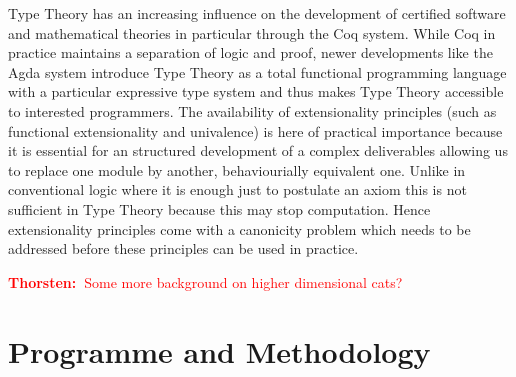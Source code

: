 \documentclass[twocolumn,a4paper]{article}
\newcommand{\txa}[1]{\textcolor{red}{\textbf{Thorsten:~}#1}}
\begin{document}
Type Theory has an increasing influence on the development of
certified software and mathematical theories in particular through the
Coq system. While Coq in practice maintains a separation of logic and
proof, newer developments like the Agda system introduce Type Theory
as a total functional programming language with a particular
expressive type system and thus makes Type Theory accessible to
interested programmers. The availability of extensionality principles
(such as functional extensionality and univalence)
is here of practical importance because it is essential for an
structured development of a complex deliverables allowing us to 
replace one module by another, behaviourially equivalent one.
Unlike in conventional logic where it is enough just to postulate an
axiom this is not sufficient in Type Theory because this may stop
computation. Hence extensionality principles come with a canonicity
problem which needs to be addressed before these principles can be used
in practice. 

\txa{Some more background on higher dimensional cats?}







\section{Programme and Methodology}
\end{document}
